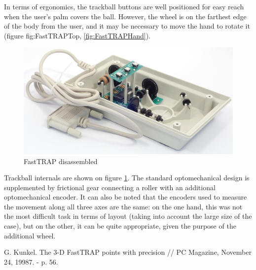 \documentclass[11pt, a4paper]{article}
\begin{document}
In terms of ergonomics, the trackball buttons are well positioned for easy reach when the user's palm covers the ball. However, the wheel is on the farthest edge of the body from the user, and it may be necessary to move the hand to rotate it (figure {fig:FastTRAPTop}, \ref{fig:FastTRAPHand}).


\begin{figure}[h]
    \centering
    \includegraphics[scale=0.6]{1987_microspeed_fasttrap/inside_15.jpg}
    \caption{FastTRAP disassembled}
    \label{fig:FastTRAPInside}
\end{figure}

Trackball internals are shown on figure \ref{fig:FastTRAPInside}. The standard optomechanical design is supplemented by frictional gear connecting a roller with an additional optomechanical encoder. It can also be noted that the encoders used to measure the movement along all three axes are the same: on the one hand, this was not the most difficult task in terms of layout (taking into account the large size of the case), but on the other, it can be quite appropriate, given the purpose of the additional wheel.

\begin{thebibliography}{9}
 G. Kunkel. The 3-D FastTRAP points with precision // PC Magazine, November 24, 19987. - p. 56.
\end{thebibliography}
\end{document}
